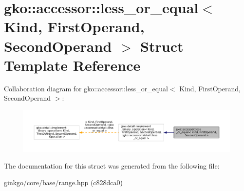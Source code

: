 \hypertarget{structgko_1_1accessor_1_1less__or__equal}{}\section{gko\+:\+:accessor\+:\+:less\+\_\+or\+\_\+equal$<$ Kind, First\+Operand, Second\+Operand $>$ Struct Template Reference}
\label{structgko_1_1accessor_1_1less__or__equal}


Collaboration diagram for gko\+:\+:accessor\+:\+:less\+\_\+or\+\_\+equal$<$ Kind, First\+Operand, Second\+Operand $>$\+:
\nopagebreak
\begin{figure}[H]
\begin{center}
\leavevmode
\includegraphics[width=350pt]{structgko_1_1accessor_1_1less__or__equal__coll__graph}
\end{center}
\end{figure}


The documentation for this struct was generated from the following file\+:\begin{DoxyCompactItemize}
\item 
ginkgo/core/base/range.\+hpp (c828dca0)\end{DoxyCompactItemize}
